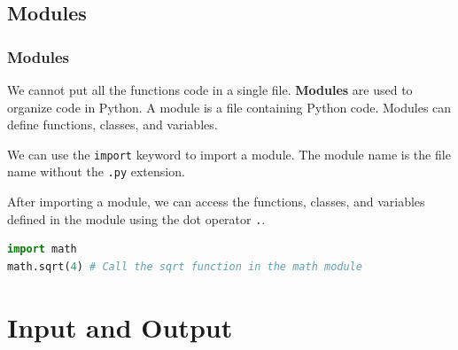 \documentclass[beamer, en, version=2.0]{huangfusl-template}
\begin{document}
    \subsection{Modules}
    \begin{frame}[fragile]
        \frametitle{Modules}

        We cannot put all the functions code in a single file. \textbf{Modules} are used to organize code in Python. A module is a file containing Python code. Modules can define functions, classes, and variables.

        We can use the {\footnotesize\verb|import|} keyword to import a module. The module name is the file name without the {\footnotesize\verb|.py|} extension.

        After importing a module, we can access the functions, classes, and variables defined in the module using the dot operator {\color{red}\footnotesize\verb|.|}\;.

\begin{lstlisting}[language=python]
import math
math.sqrt(4) # Call the sqrt function in the math module
\end{lstlisting}
    \end{frame}
    \section{Input and Output}
\end{document}

